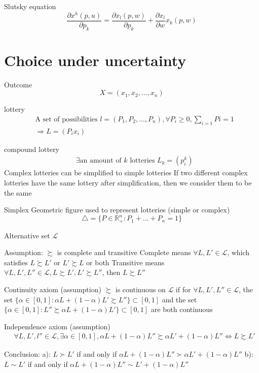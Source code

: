 \documentclass{article}
\begin{document}
Slutsky equation
$$\frac{\partial x^{h}(p,u)}{\partial p_{k}}=\frac{\partial x_{l}(p,w)}{\partial p_{k}}+\frac{\partial x_{l}}{\partial w}x_{k}(p,w)$$

\section{Choice under uncertainty}
Outcome
$$X=(x_{1},x_{2},...,x_{n})$$

lottery
\begin{align}
&\text{A set of possibilities }l=(P_{1},P_{2},...,P_{n}),\forall P_{i}\ge 0, \sum\limits_{i=1} Pi=1
\\&\Rightarrow L=(P_{i}x_{i})
\end{align}

compound lottery
\begin{align}
&\exists \text{an amount of }k \text{ lotteries } L_{k}=(p_{i}^k)
\end{align}
Complex lotteries can be simplified to simple lotteries
If two different complex lotteries have the same lottery after simplification, then we consider them to be the same

Simplex
Geometric figure used to represent lotteries (simple or complex)
$$\triangle=\{P\in \mathbb{R}_{+}^{n}:P_{1}+...+P_{n}=1 \}$$

Alternative set
$\mathscr{L}$

Assumption: $\succsim$ is complete and transitive
Complete means $\forall L,L'\in \mathscr{L}$, which satisfies $L\succsim L'$ or $L'\succsim L$ or both
Transitive means $\forall L,L',L''\in \mathscr{L},L\succsim L',L'\succsim L''$, then $L\succsim L''$

Continuity axiom (assumption)
$\succsim$ is continuous on $\mathscr{L}$ if for $\forall L,L',L''\in \mathscr{L}$, the set $\{\alpha\in [0,1]:\alpha L+(1-\alpha) L' \succsim L''\}\subset [0,1]$ and the set $\{\alpha\in [0,1]:L''\succsim \alpha L+(1-\alpha) L' \}\subset [0,1]$ are both continuous

Independence axiom (assumption)
\begin{align}
&\forall L,L',l'' \in \mathscr{L}, \exists \alpha \in [0,1],
\alpha L+(1-\alpha )L''\succsim \alpha L' +(1-\alpha)L'' \iff L \succsim L'
\end{align}

Conclusion:
a): $L\succ L'$ if and only if $\alpha L+(1-\alpha)L''\succ \alpha L' +(1-\alpha)L''$
b): $L\sim L'$ if and only if $\alpha L+(1-\alpha )L'' \sim L' +(1-\alpha)L''$
\end{document}
